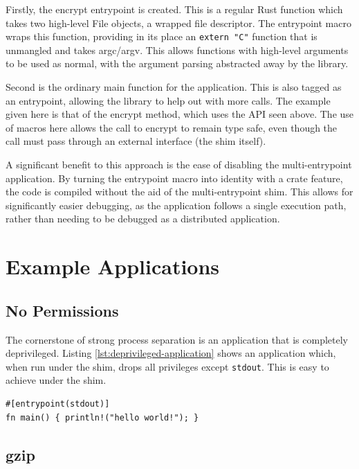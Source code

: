 \documentclass[sigplan]{acmart}
\begin{document}
Firstly, the encrypt entrypoint is created. This is a regular Rust function which takes two high-level File objects, a wrapped file descriptor. The entrypoint macro wraps this function, providing in its place an \texttt{extern "C"} function that is unmangled and takes argc/argv. This allows functions with high-level arguments to be used as normal, with the argument parsing abstracted away by the library.

Second is the ordinary main function for the application. This is also tagged as an entrypoint, allowing the library to help out with more calls. The example given here is that of the encrypt method, which uses the API seen above. The use of macros here allows the call to encrypt to remain type safe, even though the call must pass through an external interface (the shim itself).

A significant benefit to this approach is the ease of disabling the multi-entrypoint application. By turning the entrypoint macro into identity with a crate feature, the code is compiled without the aid of the multi-entrypoint shim. This allows for significantly easier debugging, as the application follows a single execution path, rather than needing to be debugged as a distributed application.

\section{Example Applications}

\subsection{No Permissions}

The cornerstone of strong process separation is an application that is completely deprivileged. Listing \ref{lst:deprivileged-application} shows an application which, when run under the shim, drops all privileges except \texttt{stdout}. This is easy to achieve under the shim.

\begin{lstlisting}[float,label={lst:deprivileged-application}]
#[entrypoint(stdout)]
fn main() { println!("hello world!"); }
\end{lstlisting}

\subsection{gzip}
\end{document}

